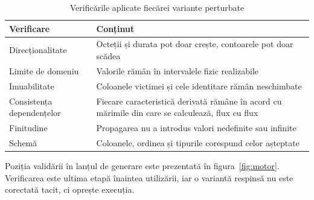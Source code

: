 \begin{table}[H]
    \caption{Verificările aplicate fiecărei variante perturbate}
    \centering
    \begin{tabular}{|l|p{7.6cm}|}
        \hline
        \textbf{Verificare} & \textbf{Conținut} \\
        \hline
        Direcționalitate & Octeții și durata pot doar crește, contoarele pot doar scădea \\
        \hline
        Limite de domeniu & Valorile rămân în intervalele fizic realizabile \\
        \hline
        Imuabilitate & Coloanele victimei și cele identitare rămân neschimbate \\
        \hline
        Consistența dependențelor & Fiecare caracteristică derivată rămâne în acord cu mărimile din care se calculează, flux cu flux \\
        \hline
        Finitudine & Propagarea nu a introdus valori nedefinite sau infinite \\
        \hline
        Schemă & Coloanele, ordinea și tipurile corespund celor așteptate \\
        \hline
    \end{tabular}
    \label{tab:verificari}
\end{table}

Poziția validării în lanțul de generare este prezentată în figura~\ref{fig:motor}. Verificarea este ultima etapă înaintea utilizării, iar o variantă respinsă nu este corectată tacit, ci oprește execuția.

